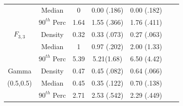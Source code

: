 \documentclass[11pt]{article}
\numberwithin{equation}{section}
\begin{document}
\begin{table}
\begin{center}
\begin{tabular} {| c | c | c | c | c | c | c |}
	 
	 			& Median 		&	0			& 	0.00 (.186)		& 	0.00 (.182)	  \\ 
				
				& $90^{th}$ Perc&	1.64			& 	1.55 (.366)		&	1.76 (.411)	 \\
	
	\hline
	
		 
	 $F_{3,3}$	 	& Density		& 	0.32			&  0.33 (.073)			&	0.27 (.063)	\\
	 
	 
	 			& Median 		&	1			& 0.97 (.202)			& 	2.00 (1.33)	  \\ 
				
				& $90^{th}$ Perc&	5.39			& 5.21(1.68)	 		&	6.50 (4.42)	 \\
	

	\hline
	
		 
	 Gamma		& Density		& 	0.47			& 0.45 (.082)			&	0.64 (.066)	\\
	 
	 
	 (0.5,0.5)		& Median 		&	0.45			& 0.35 (.122)			& 	0.70 (.138)	  \\ 
				
				& $90^{th}$ Perc&	2.71			& 2.53 (.542)			&	2.29 (.449)	 \\
	


	\hline		
	
\end{tabular}
\end{center}

\end{table}
	
	
\end{document}
